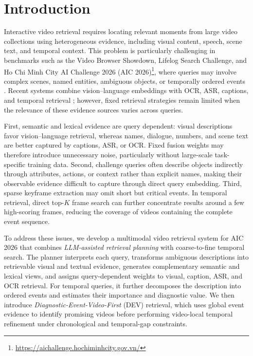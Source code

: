 \documentclass[runningheads]{llncs}
\begin{document}
\section{Introduction}
\label{sec:introduction}

Interactive video retrieval requires locating relevant moments from large
video collections using heterogeneous evidence, including visual content,
speech, scene text, and temporal context. This problem is particularly
challenging in benchmarks such as the Video Browser Showdown, Lifelog Search
Challenge, and Ho Chi Minh City AI Challenge 2026
(AIC 2026)\footnote{\url{https://aichallenge.hochiminhcity.gov.vn/}}, where
queries may involve complex scenes, named entities, ambiguous objects, or
temporally ordered events
\cite{schoeffmann2014video,tran2025state,do2027abstraction}.
Recent systems combine vision--language embeddings with OCR, ASR, captions,
and temporal retrieval
\cite{nguyen2027aithena,nguyen2027vortex}; however, fixed retrieval
strategies remain limited when the relevance of these evidence sources varies
across queries.

First, semantic and lexical evidence are query dependent: visual
descriptions favor vision--language retrieval, whereas names, dialogue,
numbers, and scene text are better captured by captions, ASR, or OCR.
Fixed fusion weights may therefore introduce unnecessary noise, particularly
without large-scale task-specific training data. Second, challenge queries
often describe objects indirectly through attributes, actions, or context
rather than explicit names, making their observable evidence difficult to
capture through direct query embedding. Third, sparse keyframe extraction may
omit short but critical events. In temporal retrieval, direct top-$K$ frame
search can further concentrate results around a few high-scoring frames,
reducing the coverage of videos containing the complete event sequence.

To address these issues, we develop a multimodal video retrieval system for
AIC 2026 that combines \emph{LLM-assisted retrieval planning} with
coarse-to-fine temporal search. The planner interprets each query, transforms
ambiguous descriptions into retrievable visual and textual evidence,
generates complementary semantic and lexical views, and assigns
query-dependent weights to visual, caption, ASR, and OCR retrieval. For
temporal queries, it further decomposes the description into ordered events
and estimates their importance and diagnostic value. We then introduce
\emph{Diagnostic-Event-Video-First} (DEV) retrieval, which uses global event
evidence to identify promising videos before performing video-local temporal
refinement under chronological and temporal-gap constraints.
\end{document}
